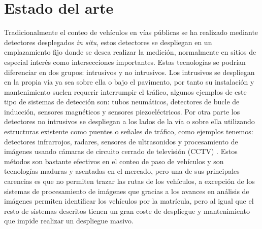 \documentclass[../proyecto.tex]{subfiles}
\begin{document}
\chapter{Estado del arte}

Tradicionalmente el conteo de vehículos en vías públicas se ha realizado mediante detectores desplegados \textit{in situ}, estos detectores se despliegan en un emplazamiento fijo donde se desea realizar la medición, normalmente en sitios de especial interés como intersecciones importantes. Estas tecnologías se podrían diferenciar en dos grupos: intrusivos y no intrusivos. Los intrusivos se despliegan en la propia vía ya sea sobre ella o bajo el pavimento, por tanto su instalación y mantenimiento suelen requerir interrumpir el tráfico, algunos ejemplos de este tipo de sistemas de detección son: tubos neumáticos, detectores de bucle de inducción, sensores magnéticos y sensores piezoeléctricos. Por otra parte los detectores no intrusivos se despliegan a los lados de la vía o sobre ella utilizando estructuras existente como puentes o señales de tráfico, como ejemplos tenemos: detectores infrarrojos, radares, sensores de ultrasonidos y  procesamiento de imágenes usando cámaras de circuito cerrado de televisión (CCTV) \cite{MIMBELA20078}. Estos métodos son bastante efectivos en el conteo de paso de vehículos \cite{CZYZEWSKI20196} y son tecnologías maduras y asentadas en el mercado, pero una de sus principales carencias es que no permiten trazar las rutas de los vehículos, a excepción de los sistemas de procesamiento de imágenes que gracias a los avances en análisis de imágenes permiten identificar los vehículos por la matrícula, pero al igual que el resto de sistemas descritos tienen un gran coste de despliegue y mantenimiento que impide realizar un despliegue masivo.\\
\end{document}
